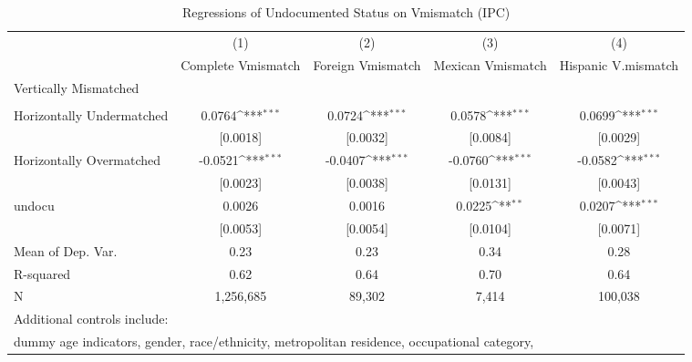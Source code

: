 \begin{table}[htbp]\centering
\def\sym#1{\ifmmode^{#1}\else\(^{#1}\)\fi}
\caption{Regressions of Undocumented Status on Vmismatch (IPC)}
\begin{tabular}{l*{4}{c}}
\toprule
                    &\multicolumn{1}{c}{(1)}         &\multicolumn{1}{c}{(2)}         &\multicolumn{1}{c}{(3)}         &\multicolumn{1}{c}{(4)}         \\
                    &Complete Vmismatch         &Foreign Vmismatch         &Mexican Vmismatch         &Hispanic V.mismatch         \\
\midrule
Vertically Mismatched&                     &                     &                     &                     \\
                    &                     &                     &                     &                     \\
\addlinespace
Horizontally Undermatched&      0.0764\sym{***}&      0.0724\sym{***}&      0.0578\sym{***}&      0.0699\sym{***}\\
                    &    [0.0018]         &    [0.0032]         &    [0.0084]         &    [0.0029]         \\
\addlinespace
Horizontally Overmatched&     -0.0521\sym{***}&     -0.0407\sym{***}&     -0.0760\sym{***}&     -0.0582\sym{***}\\
                    &    [0.0023]         &    [0.0038]         &    [0.0131]         &    [0.0043]         \\
\addlinespace
undocu              &      0.0026         &      0.0016         &      0.0225\sym{**} &      0.0207\sym{***}\\
                    &    [0.0053]         &    [0.0054]         &    [0.0104]         &    [0.0071]         \\
\midrule
Mean of Dep. Var.   &        0.23         &        0.23         &        0.34         &        0.28         \\
R-squared           &        0.62         &        0.64         &        0.70         &        0.64         \\
N                   &   1,256,685         &      89,302         &       7,414         &     100,038         \\
\bottomrule
\multicolumn{5}{l}{\footnotesize Additional controls include:}\\
\multicolumn{5}{l}{\footnotesize dummy age indicators, gender, race/ethnicity, metropolitan residence, occupational category,}\\

\end{tabular}
\end{table}
